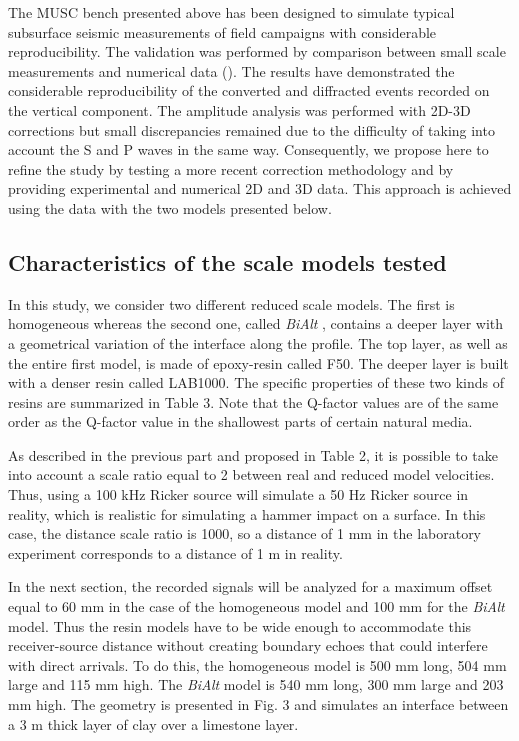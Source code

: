 \documentclass[extra,mreferee]{gji}
\newcommand{\bialt}{\textit{BiAlt} }
\begin{document}
The MUSC bench presented above has been designed to simulate typical subsurface seismic measurements of field campaigns with considerable reproducibility. The validation was performed by comparison between small scale measurements and numerical data (\cite{Bretaudeau_SSM_2011}). The results have demonstrated the considerable reproducibility of the converted and diffracted events recorded on the vertical component. The amplitude analysis was performed with 2D-3D corrections but small discrepancies remained due to the difficulty of taking into account the S and P waves in the same way. Consequently, we propose here to refine the study by testing a more recent correction methodology \cite{Schafer_LSS_2014} and by providing experimental and numerical 2D and 3D data. This approach is achieved using the data with the two models presented below.


\subsection{Characteristics of the scale models tested}

In this study, we consider two different reduced scale models. The first is homogeneous whereas the second one, called \bialt, contains a deeper layer with a geometrical variation of the interface along the profile. The top layer, as well as the entire first model, is made of epoxy-resin called F50. The deeper layer is built with a denser resin called LAB1000. The specific properties of these two kinds of resins are summarized in Table 3. Note that the Q-factor values are of the same order as the Q-factor value in the shallowest parts of certain natural media.

As described in the previous part and proposed in Table 2, it is possible to take into account a scale ratio equal to 2 between real and reduced model velocities. Thus, using a 100 kHz Ricker source will simulate a 50 Hz Ricker source in reality, which is realistic for simulating a hammer impact on a surface. In this case, the distance scale ratio is 1000, so a distance of 1 mm in the laboratory experiment corresponds to a distance of 1 m in reality. 

In the next section, the recorded signals will be analyzed for a maximum offset equal to 60 mm in the case of the homogeneous model and 100 mm for the \bialt model. Thus the resin models have to be wide enough to accommodate this receiver-source distance without creating boundary echoes that could interfere with direct arrivals. To do this, the homogeneous model is 500 mm long, 504 mm large and 115 mm high. The \bialt model is 540 mm long, 300 mm large and 203 mm high. The geometry is presented in Fig. 3 and simulates an interface between a 3 m thick layer of clay over a limestone layer.
\end{document}
